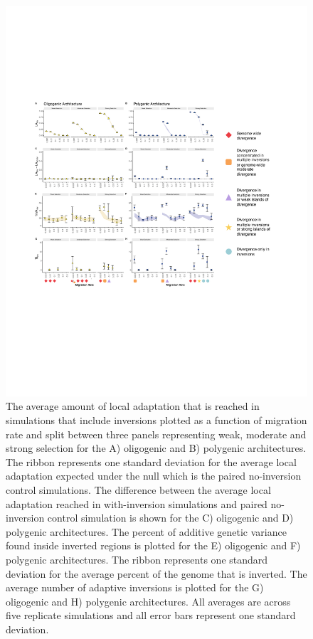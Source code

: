 \documentclass[10pt, scrartlc]{article}
\begin{document}
\begin{figure}[h]
	\begin{center}
		\includegraphics[width = 6.5 in]{Fig2_LA.pdf}
	\end{center}
	\caption[Local Adaptation]{The average amount of local adaptation that is reached in simulations that include inversions plotted as a function of migration rate and split between three panels representing weak, moderate and strong selection for the A) oligogenic and B) polygenic architectures. The ribbon represents one standard deviation for the average local adaptation expected under the null which is the paired no-inversion control simulations. The difference between the average local adaptation reached in with-inversion simulations and paired no-inversion control simulation is shown for the C) oligogenic and D) polygenic architectures. The percent of additive genetic variance found inside inverted regions is plotted for the E) oligogenic and F) polygenic architectures. The ribbon represents one standard deviation for the average percent of the genome that is inverted. The average number of adaptive inversions is plotted for the G) oligogenic and H) polygenic architectures. All averages are across five replicate simulations and all error bars represent one standard deviation.}
\end{figure}
\end{document}
